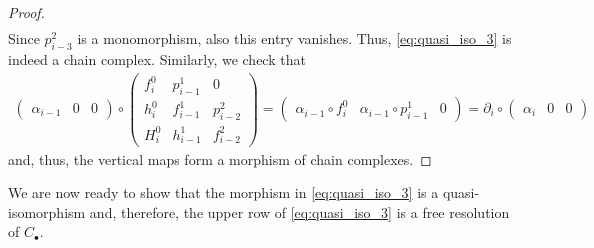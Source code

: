 \begin{proof}
\begin{equation*}
\begin{aligned}
\end{aligned}
\end{equation*}
Since $p_{i\minus 3}^2$ is a monomorphism, also this entry vanishes. Thus, \eqref{eq:quasi_iso_3} is indeed a chain complex. Similarly, we check that
\begin{equation*}
\begin{aligned}
\begin{pmatrix}\alpha_{i\minus 1} & 0 & 0\end{pmatrix}\circ \begin{pmatrix}f_i^0 & p_{i\minus 1}^1 & 0 \\ h_i^0 & f_{i\minus 1}^1 & p_{i\minus 2}^2 \\ H_i^0 & h_{i\minus 1}^1 & f_{i\minus 2}^2 \end{pmatrix}=\begin{pmatrix}\alpha_{i\minus 1}\circ f_i^0 & \alpha_{i\minus 1}\circ p_{i\minus 1}^1 & 0 \end{pmatrix}=\partial_{i}\circ \begin{pmatrix} \alpha_i & 0 & 0 \end{pmatrix}
\end{aligned}
\end{equation*}
and, thus, the vertical maps form a morphism of chain complexes.
\end{proof}
%
We are now ready to show that the morphism in \eqref{eq:quasi_iso_3} is a quasi-isomorphism and, therefore, the upper row of \eqref{eq:quasi_iso_3} is a free resolution of $C_\bullet$.
%
\quasiisologpath*
%
